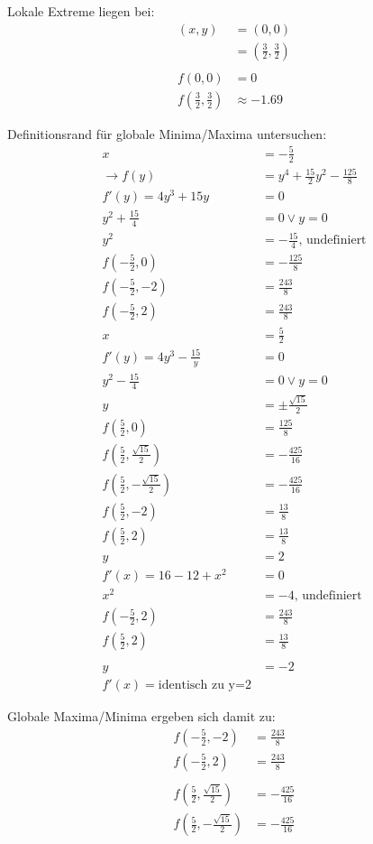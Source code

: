 \documentclass{standalone}
\begin{document}
Lokale Extreme liegen bei:
\begin{align}
    (x,y) &= (0,0) \\
    &= (\frac{3}{2}, \frac{3}{2}) \\
    \\
    f(0,0) &= 0 \\
    f(\frac{3}{2}, \frac{3}{2}) &\approx -1.69
\end{align}

Definitionsrand für globale Minima/Maxima untersuchen:
\begin{align}
    x &= -\frac{5}{2} \\
    \rightarrow f(y) &= y^4 + \frac{15}{2} y^2 - \frac{125}{8} \\
    f'(y) = 4y^3 + 15y &= 0 \\
    y^2 + \frac{15}{4} &= 0 \vee y = 0 \\
    y^2 &= -\frac{15}{4} \text{, undefiniert} \\
    f(-\frac{5}{2},0) &= -\frac{125}{8}\\
    f(-\frac{5}{2},-2) &= \frac{243}{8}\\
    f(-\frac{5}{2},2) &= \frac{243}{8}
    \\
    x&= \frac{5}{2} \\
    f'(y) = 4y^3 -\frac{15}y &= 0 \\
    y^2 -\frac{15}{4} &= 0 \vee y=0\\
    y &= \pm \frac{\sqrt{15}}{2} \\
    f(\frac{5}{2},0) &= \frac{125}{8} \\
    f(\frac{5}{2},\frac{\sqrt{15}}{2}) &= -\frac{425}{16} \\
    f(\frac{5}{2},-\frac{\sqrt{15}}{2}) &= -\frac{425}{16} \\
    f(\frac{5}{2}, -2) &= \frac{13}{8} \\
    f(\frac{5}{2}, 2) &= \frac{13}{8}
    \\
    y&=2 \\
    f'(x) = 16-12+x^2 &= 0 \\
    x^2 &= -4 \text{, undefiniert} \\
    f(-\frac{5}{2},2) &= \frac{243}{8} \\
    f(\frac{5}{2},2) &= \frac{13}{8} \\
    \\
    y&=-2 \\
    f'(x) = \text{identisch zu y=2}
\end{align}

Globale Maxima/Minima ergeben sich damit zu:
\begin{align}
    f(-\frac{5}{2},-2) &= \frac{243}{8} \\
    f(-\frac{5}{2}, 2) &= \frac{243}{8} \\
    \\
    f(\frac{5}{2},\frac{\sqrt{15}}{2}) &= -\frac{425}{16} \\
    f(\frac{5}{2},-\frac{\sqrt{15}}{2}) &= -\frac{425}{16}
\end{align}
\end{document}
